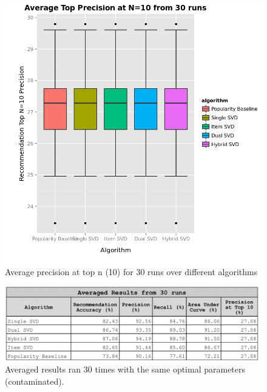 \begin{figure}
\centering
\includegraphics[scale=0.6]{recent_images/top_n.png}
\caption{Average precision at top n (10) for 30 runs over different algorithms}
\label{fig:top_n}
\end{figure}

\begin{figure}
\centering
\includegraphics[scale=0.3]{images/results_tuning.png}
\caption{Averaged results ran 30 times with the same optimal parameters (contaminated).}
\label{fig:results}
\end{figure}

